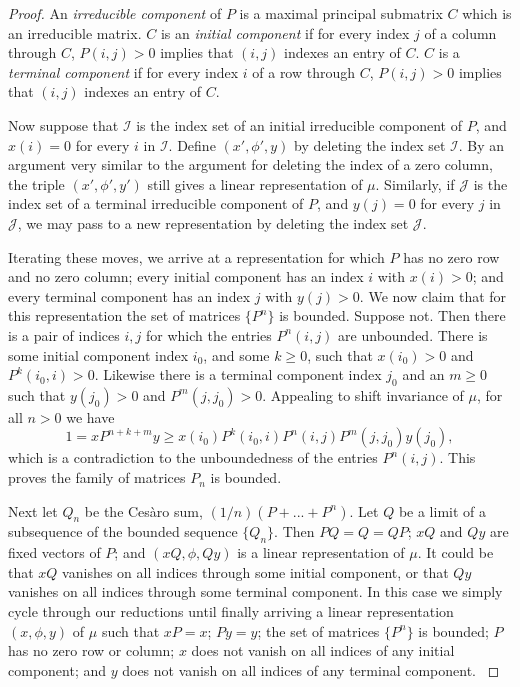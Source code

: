 \documentclass{kepart2010}
\theoremstyle{plain}
\theoremstyle{definition}
\theoremstyle{remark}
\theoremstyle{definition}
\numberwithin{equation}{section}
\begin{document}
\begin{proof}
An {\em irreducible component} of $P$ is a maximal principal
submatrix $C$ which is an irreducible matrix. $C$ is an {\em initial
component} if
 for every index $j$ of a column through $C$, $P(i,j)>0$ implies
that $(i,j)$ indexes an entry of $C$. $C$ is a {\em terminal
component} if
 for every index $i$ of a row through $C$, $P(i,j)>0$ implies
that $(i,j)$ indexes an entry of $C$.

Now suppose that $\mathcal I$ is the index set of an initial
irreducible component of $P$, and $x(i)=0$ for every $i$ in
$\mathcal I$. Define $(x',\phi ',y)$ by deleting the index set
$\mathcal I$. By an argument very similar to the argument for
deleting the index of a zero column, the triple $(x',\phi ',y')$
still gives a linear representation of $\mu$. Similarly, if
$\mathcal J$ is the index set of a terminal irreducible component of
$P$, and $y(j)=0$ for every $j$ in $\mathcal J$, we may pass to a
new representation by deleting the index set $\mathcal J$.

Iterating these moves, we arrive at a representation for which $P$
has no zero row and no zero column; every initial component has an
index $i$ with $x(i)>0$; and every terminal component has an index
$j$ with $y(j)>0$. We now claim that for this representation the set
of matrices $\{P^n\}$ is bounded. Suppose not. Then there is a pair
of indices $i,j$ for which the entries $P^n(i,j)$ are unbounded.
There is some initial component
index $i_0$, and some $k\geq 0$, such that
$x(i_0)>0$ and $P^k(i_0,i)>0$. Likewise there is a terminal
component index
$j_0$ and an $m\geq 0$ such that $y(j_0)>0$ and $P^m(j,j_0)>0$.
Appealing to shift invariance of $\mu$, for all $n>0$ we have
 \begin{equation}
1=xP^{n+k+m}y \geq x(i_0)P^k(i_0,i)P^n(i,j)P^m(j,j_0)y(j_0),
 \end{equation}
which is a contradiction to the unboundedness of the entries
$P^n(i,j)$. This proves the family of matrices $P_n$ is bounded.

Next let $Q_n$ be the Ces\`{a}ro sum, $(1/n)(P + ... + P^n)$. Let
$Q$ be a limit of  a subsequence of the bounded sequence $\{Q_n\}$.
Then $PQ=Q=QP$; $xQ$ and $Qy$ are {}{fixed vectors} of $P$; and
$(xQ,\phi ,Qy)$ is a linear representation of $\mu$. It could be
that $xQ$ vanishes on all indices through some initial component, or
that $Qy$ vanishes on all indices through some terminal component.
In this case we simply cycle through our reductions until finally
arriving a linear representation $(x,\phi ,y)$ of $\mu$ such that
{}{$xP=x$;  $Py=y$; the set of matrices $\{P^n\}$ is bounded;
 $P$ has no zero row or column; $x$ does not vanish
on all indices of any initial component; and $y$ does not vanish on
all indices of any terminal component.
}


\end{proof}
\end{document}
